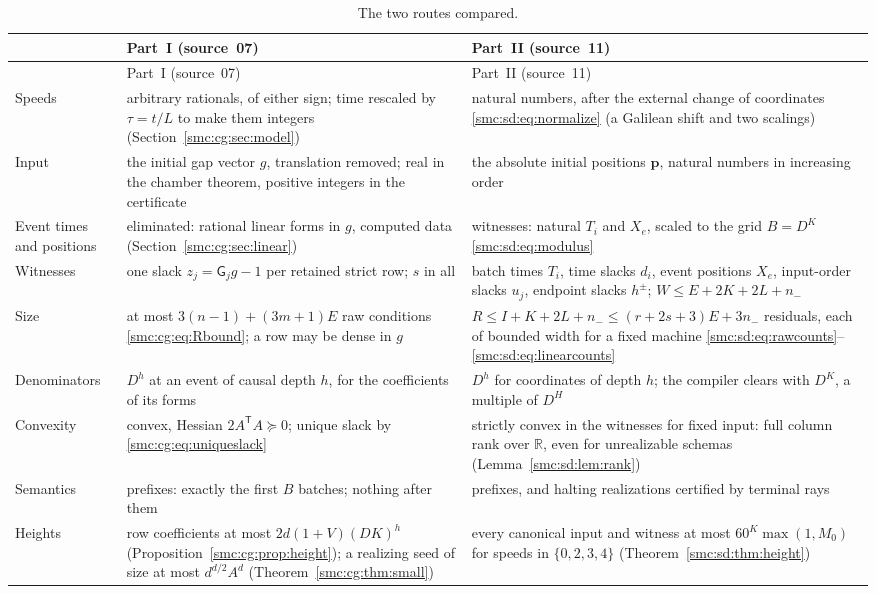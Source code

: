\documentclass[11pt,letterpaper]{article}
\numberwithin{equation}{section}
\theoremstyle{definition}
\theoremstyle{remark}
\newcommand{\R}{\mathbb R}
\newcommand{\nminus}{n_{-}}
\begin{document}
\begin{center}
\small
\begin{longtable}{@{}L{0.2\textwidth}L{0.37\textwidth}L{0.37\textwidth}@{}}
\caption{The two routes compared.}\label{smc:tab:routes}\\
\toprule
 & Part~I (source~07) & Part~II (source~11)\\
\midrule
\endfirsthead
\toprule
 & Part~I (source~07) & Part~II (source~11)\\
\midrule
\endhead
Speeds & arbitrary rationals, of either sign; time rescaled by $\tau=t/L$ to make them integers (Section~\ref{smc:cg:sec:model}) & natural numbers, after the external change of coordinates \eqref{smc:sd:eq:normalize} (a Galilean shift and two scalings)\\
Input & the initial gap vector $g$, translation removed; real in the chamber theorem, positive integers in the certificate & the absolute initial positions $\mathbf p$, natural numbers in increasing order\\
Event times and positions & eliminated: rational linear forms in $g$, computed data (Section~\ref{smc:cg:sec:linear}) & witnesses: natural $T_i$ and $X_e$, scaled to the grid $B=D^K$ \eqref{smc:sd:eq:modulus}\\
Witnesses & one slack $z_j=\mathsf G_jg-1$ per retained strict row; $s$ in all & batch times $T_i$, time slacks $d_i$, event positions $X_e$, input-order slacks $u_j$, endpoint slacks $h^\pm$; $W\le E+2K+2L+\nminus$\\
Size & at most $3(n-1)+(3m+1)E$ raw conditions \eqref{smc:cg:eq:Rbound}; a row may be dense in $g$ & $R\le I+K+2L+\nminus\le(r+2s+3)E+3\nminus$ residuals, each of bounded width for a fixed machine \eqref{smc:sd:eq:rawcounts}--\eqref{smc:sd:eq:linearcounts}\\
Denominators & $D^h$ at an event of causal depth $h$, for the coefficients of its forms & $D^h$ for coordinates of depth $h$; the compiler clears with $D^K$, a multiple of $D^H$\\
Convexity & convex, Hessian $2A^{\mathsf T}A\succeq0$; unique slack by \eqref{smc:cg:eq:uniqueslack} & strictly convex in the witnesses for fixed input: full column rank over $\R$, even for unrealizable schemas (Lemma~\ref{smc:sd:lem:rank})\\
Semantics & prefixes: exactly the first $B$ batches; nothing after them & prefixes, and halting realizations certified by terminal rays\\
Heights & row coefficients at most $2d(1+V)(DK)^h$ (Proposition~\ref{smc:cg:prop:height}); a realizing seed of size at most $d^{d/2}A^d$ (Theorem~\ref{smc:cg:thm:small}) & every canonical input and witness at most $60^K\max(1,M_0)$ for speeds in $\{0,2,3,4\}$ (Theorem~\ref{smc:sd:thm:height})\\

\end{longtable}
\end{center}
\end{document}
